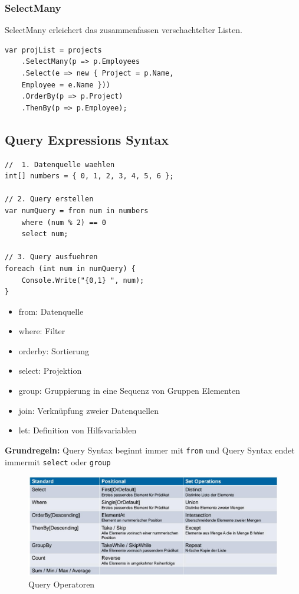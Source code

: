 \documentclass[
a4paper,
oneside,
10pt,
fleqn,
headsepline,
toc=listofnumbered, 
bibliography=totocnumbered]{scrartcl}
\begin{document}
\subsubsection{SelectMany}
SelectMany erleichert das zusammenfassen verschachtelter Listen.
\begin{lstlisting}
var projList = projects
	.SelectMany(p => p.Employees
	.Select(e => new { Project = p.Name, 
	Employee = e.Name }))
	.OrderBy(p => p.Project)
	.ThenBy(p => p.Employee);
\end{lstlisting}


\subsection{Query Expressions Syntax}
\begin{lstlisting}
//  1. Datenquelle waehlen
int[] numbers = { 0, 1, 2, 3, 4, 5, 6 };

// 2. Query erstellen
var numQuery = from num in numbers
	where (num % 2) == 0
	select num;

// 3. Query ausfuehren
foreach (int num in numQuery) {
	Console.Write("{0,1} ", num);
}
\end{lstlisting}

\begin{itemize}
	\item from: Datenquelle
	\item where: Filter
	\item orderby: Sortierung
	\item select: Projektion
	\item group:  Gruppierung in eine Sequenz von Gruppen Elementen
	\item join: Verknüpfung zweier Datenquellen
	\item let: Definition von Hilfsvariablen
\end{itemize}
\textbf{Grundregeln:} Query Syntax beginnt immer mit \lstinline|from| und Query Syntax endet immermit \lstinline|select| oder \lstinline|group|
\begin{figure}[ht]
	\centering
	\includegraphics[width=\linewidth]{images/linq_query_operatoren}
	\caption{Query Operatoren}
	\label{fig:linqqueryoperatoren}
\end{figure}
\end{document}
